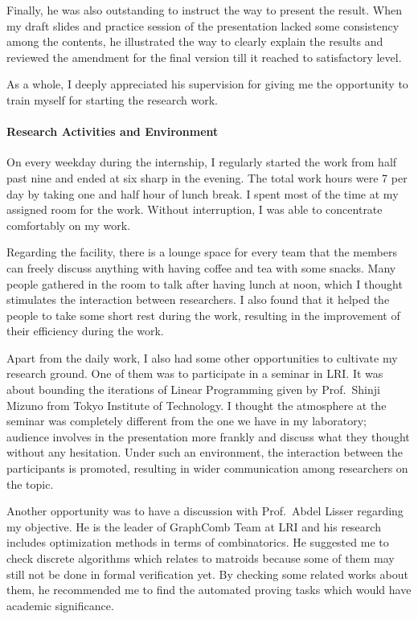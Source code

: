 \documentclass[a4paper,10.5pt]{article}
\begin{document}
Finally, he was also outstanding to instruct the way to present the
result. When my draft slides and practice session of the presentation
lacked some consistency among the contents, he illustrated the way to
clearly explain the results and reviewed the amendment for the final
version till it reached to satisfactory level.

As a whole, I deeply appreciated his supervision for giving me the
opportunity to train myself for starting the research work.

\paragraph{Research Activities and Environment}

On every weekday during the internship, I regularly started the work
from half past nine and ended at six sharp in the evening. The total
work hours were 7 per day by taking one and half hour of lunch
break. I spent most of the time at my assigned room for the
work. Without interruption, I was able to concentrate comfortably on
my work.

Regarding the facility, there is a lounge space for every team that
the members can freely discuss anything with having coffee and tea
with some snacks. Many people gathered in the room to talk after
having lunch at noon, which I thought stimulates the interaction
between researchers. I also found that it helped the people to take
some short rest during the work, resulting in the improvement of their
efficiency during the work.

Apart from the daily work, I also had some other opportunities to
cultivate my research ground. One of them was to participate in a
seminar in LRI. It was about bounding the iterations of Linear
Programming given by Prof.\ Shinji Mizuno from Tokyo Institute of
Technology. I thought the atmosphere at the seminar was completely
different from the one we have in my laboratory; audience involves in
the presentation more frankly and discuss what they thought without
any hesitation. Under such an environment, the interaction between the
participants is promoted, resulting in wider communication among
researchers on the topic.

Another opportunity was to have a discussion with Prof.\ Abdel Lisser
regarding my objective. He is the leader of GraphComb Team at LRI and
his research includes optimization methods in terms of combinatorics.
He suggested me to check discrete algorithms which relates to matroids
because some of them may still not be done in formal verification
yet. By checking some related works about them, he recommended me to
find the automated proving tasks which would have academic
significance.
\end{document}

